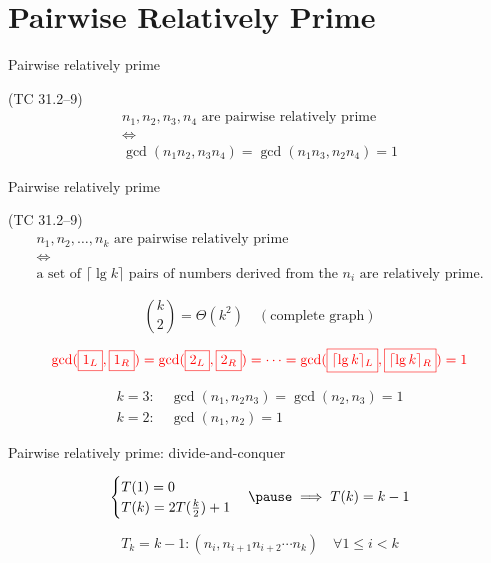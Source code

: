 \section{Pairwise Relatively Prime}

\begin{frame}{Pairwise relatively prime}
  \begin{exampleblock}{(TC 31.2--9)}
	\begin{gather*}
	  n_1, n_2, n_3, n_4 \text{ are pairwise relatively prime} \\
	  \iff \\
	  \gcd(n_1n_2, n_3n_4) = \gcd(n_1n_3, n_2n_4) = 1
	\end{gather*}
  \end{exampleblock}
\end{frame}
\begin{frame}{Pairwise relatively prime}
  \begin{exampleblock}{(TC 31.2--9)}
	\begin{gather*}
	  n_1, n_2, \dots, n_k \text{ are pairwise relatively prime} \\
	  \iff \\
	  \text{a set of } \lceil \lg k \rceil \text{ pairs of numbers derived from the } n_i \text{ are relatively prime}.
	\end{gather*}
  \end{exampleblock}

  \pause
  \[
	\binom{k}{2} = \Theta(k^2)	\quad (\text{complete graph})
  \]

  \pause
  \[
	\textcolor{red}{\gcd(\fbox{$1_L$}, \fbox{$1_R$}) 
	= \gcd(\fbox{$2_L$}, \fbox{$2_R$}) 
	= \cdots 
	= \gcd(\fbox{$\lceil \lg k \rceil_L$}, \fbox{$\lceil \lg k \rceil_R$}) = 1}
  \]

  \pause
  \begin{gather*}
	k = 3: \quad \gcd(n_1, n_2n_3) = \gcd(n_2, n_3) = 1 \\
	k = 2: \quad \gcd(n_1, n_2) = 1
  \end{gather*}
\end{frame}
\begin{frame}{Pairwise relatively prime: divide-and-conquer}


  \pause
  \begin{equation*}
	\begin{cases}
	  T(1) = 0 \\
	  T(k) = 2T(\frac{k}{2}) + 1
	\end{cases} \pause \implies T(k) = k - 1
  \end{equation*}

  \pause
  \[
	T_k = k-1: (n_i, n_{i+1}n_{i+2}\cdots n_{k}) \quad \forall 1 \le i < k
  \]
\end{frame}
